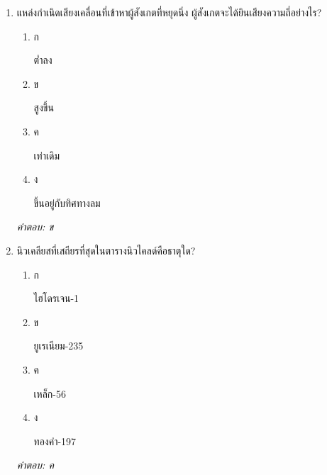 \documentclass[12pt]{article}
\begin{document}
\begin{enumerate}[label=\arabic*., itemsep=0.5\baselineskip, topsep=0.5\baselineskip, leftmargin=*]
\item แหล่งกำเนิดเสียงเคลื่อนที่เข้าหาผู้สังเกตที่หยุดนิ่ง ผู้สังเกตจะได้ยินเสียงความถี่อย่างไร?
\begin{enumerate}[label=\alph*)., itemsep=0.3\baselineskip, topsep=0.3\baselineskip]
\item ก\ 
\begin{minipage}[t]{0.9\linewidth}
\raggedright ต่ำลง
\end{minipage}
\item ข\ 
\begin{minipage}[t]{0.9\linewidth}
\raggedright สูงขึ้น
\end{minipage}
\item ค\ 
\begin{minipage}[t]{0.9\linewidth}
\raggedright เท่าเดิม
\end{minipage}
\item ง\ 
\begin{minipage}[t]{0.9\linewidth}
\raggedright ขึ้นอยู่กับทิศทางลม
\end{minipage}
\end{enumerate}
\vspace{-0.3\baselineskip}
\begin{small}
\textit{คำตอบ: ข}
\end{small}

\item นิวเคลียสที่เสถียรที่สุดในตารางนิวไคลด์คือธาตุใด?
\begin{enumerate}[label=\alph*)., itemsep=0.3\baselineskip, topsep=0.3\baselineskip]
\item ก\ 
\begin{minipage}[t]{0.9\linewidth}
\raggedright ไฮโดรเจน-1
\end{minipage}
\item ข\ 
\begin{minipage}[t]{0.9\linewidth}
\raggedright ยูเรเนียม-235
\end{minipage}
\item ค\ 
\begin{minipage}[t]{0.9\linewidth}
\raggedright เหล็ก-56
\end{minipage}
\item ง\ 
\begin{minipage}[t]{0.9\linewidth}
\raggedright ทองคำ-197
\end{minipage}
\end{enumerate}
\vspace{-0.3\baselineskip}
\begin{small}
\textit{คำตอบ: ค}
\end{small}


\end{enumerate}
\end{document}
